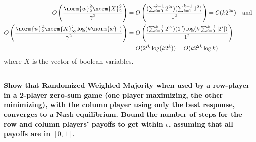 \documentclass[a4paper,12pt]{article}
\theoremstyle{remark}
\begin{document}
    \begin{align*}
        O \left( \frac{\norm{w}_2^2 \norm{X}_2^2}{\gamma^2} \right) &= O \left( \frac{(\sum_{i = 0}^{k - 1} 2^{2i})(\sum_{i = 1}^{k - 1} 1^2)}{1^2} \right) = O(k2^{2k}) \quad \text{and} \\
        O \left( \frac{\norm{w}_2^2 \norm{X}_\infty^2 \log(k \norm{w}_1)}{\gamma^2} \right) &= O \left( \frac{(\sum_{i = 0}^{k - 1} 2^{2i})(1^2) \log(k \sum_{i = 0}^{k - 1} |2^i|)}{1^2} \right) \\
        &= O(2^{2k}\log(k2^k)) = O(k2^{2k}\log k)
    \end{align*}
    where $X$ is the vector of boolean variables.

\subsection{}
    \boldmath\textbf{Show that Randomized Weighted Majority when used by a row-player in a 2-player zero-sum game (one player maximizing, the other minimizing), with the column player using only the best response, converges to a Nash equilibrium. Bound the number of steps for the row and column players' payoffs to get within $\epsilon$, assuming that all payoffs are in $[0, 1]$.
    }\unboldmath \par
\end{document}
